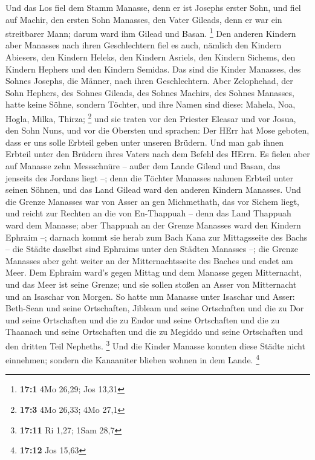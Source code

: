  Und das Los fiel dem Stamm Manasse, denn er ist Josephs
erster Sohn, und fiel auf Machir, den ersten Sohn Manasses, den Vater
Gileads, denn er war ein streitbarer Mann; darum ward ihm Gilead und
Basan. \footnote{\textbf{17:1} 4Mo 26,29; Jos 13,31}  Den
anderen Kindern aber Manasses nach ihren Geschlechtern fiel es auch,
nämlich den Kindern Abiesers, den Kindern Heleks, den Kindern Asriels,
den Kindern Sichems, den Kindern Hephers und den Kindern Semidas. Das
sind die Kinder Manasses, des Sohnes Josephs, die Männer, nach ihren
Geschlechtern.  Aber Zelophehad, der Sohn Hephers, des
Sohnes Gileads, des Sohnes Machirs, des Sohnes Manasses, hatte keine
Söhne, sondern Töchter, und ihre Namen sind diese: Mahela, Noa, Hogla,
Milka, Thirza; \footnote{\textbf{17:3} 4Mo 26,33; 4Mo 27,1} 
und sie traten vor den Priester Eleasar und vor Josua, den Sohn Nuns,
und vor die Obersten und sprachen: Der HErr hat Mose geboten, dass er
uns solle Erbteil geben unter unseren Brüdern. Und man gab ihnen Erbteil
unter den Brüdern ihres Vaters nach dem Befehl des HErrn. 
Es fielen aber auf Manasse zehn Messschnüre -- außer dem Lande Gilead
und Basan, das jenseits des Jordans liegt --;  denn die
Töchter Manasses nahmen Erbteil unter seinen Söhnen, und das Land Gilead
ward den anderen Kindern Manasses.  Und die Grenze Manasses
war von Asser an gen Michmethath, das vor Sichem liegt, und reicht zur
Rechten an die von En-Thappuah --  denn das Land Thappuah
ward dem Manasse; aber Thappuah an der Grenze Manasses ward den Kindern
Ephraim --;  darnach kommt sie herab zum Bach Kana zur
Mittagsseite des Bachs -- die Städte daselbst sind Ephraims unter den
Städten Manasses --; die Grenze Manasses aber geht weiter an der
Mitternachtsseite des Baches und endet am Meer.  Dem
Ephraim ward's gegen Mittag und dem Manasse gegen Mitternacht, und das
Meer ist seine Grenze; und sie sollen stoßen an Asser von Mitternacht
und an Isaschar von Morgen.  So hatte nun Manasse unter
Isaschar und Asser: Beth-Sean und seine Ortschaften, Jibleam und seine
Ortschaften und die zu Dor und seine Ortschaften und die zu Endor und
seine Ortschaften und die zu Thaanach und seine Ortschaften und die zu
Megiddo und seine Ortschaften und den dritten Teil Nepheths. \footnote{\textbf{17:11}
  Ri 1,27; 1Sam 28,7}  Und die Kinder Manasse konnten diese
Städte nicht einnehmen; sondern die Kanaaniter blieben wohnen in dem
Lande. \footnote{\textbf{17:12} Jos 15,63}

